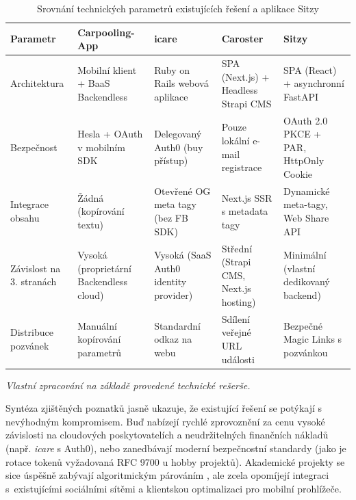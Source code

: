 \documentclass[male,czech,api_bc]{kitheses}
\renewcommand{\arraystretch}{1.23}
\newcommand{\zdroj}[1]{%
    \vspace{1ex}%
    {\footnotesize \raggedright \textit{#1}\par}%
}
\begin{document}
\begin{table}[htbp]
\renewcommand{\arraystretch}{1.4}
\small
\begin{tabularx}{\textwidth}{>{\raggedright\arraybackslash}p{3cm}
                              >{\raggedright\arraybackslash}X
                              >{\raggedright\arraybackslash}X
                              >{\raggedright\arraybackslash}X
                              >{\raggedright\arraybackslash}X}
\toprule
\textbf{Parametr} & \textbf{Carpooling-App} \cite{Raut2016} & \textbf{icare} \cite{Icare2025} & \textbf{Caroster} \cite{Caroster2026} & \textbf{Sitzy} \\
\midrule
Architektura & Mobilní klient + BaaS Backendless & Ruby on Rails webová aplikace & SPA (Next.js) + Headless Strapi CMS & SPA (React) + asynchronní FastAPI \\
\addlinespace
Bezpečnost & Hesla + OAuth v mobilním SDK & Delegovaný Auth0 (buy přístup) & Pouze lokální e-mail registrace & OAuth 2.0 PKCE + PAR, HttpOnly Cookie \\
\addlinespace
Integrace obsahu & Žádná (kopírování textu) & Otevřené OG meta tagy (bez FB SDK) & Next.js SSR s metadata tagy & Dynamické meta-tagy, Web Share API \\
\addlinespace
Závislost na 3. stranách & Vysoká (proprietární Backendless cloud) & Vysoká (SaaS Auth0 identity provider) & Střední (Strapi CMS, Next.js hosting) & Minimální (vlastní dedikovaný backend) \\
\addlinespace
Distribuce pozvánek & Manuální kopírování parametrů & Standardní odkaz na webu & Sdílení veřejné URL události & Bezpečné Magic Links s pozvánkou \\
\bottomrule
\end{tabularx}
\caption{Srovnání technických parametrů existujících řešení a aplikace Sitzy}
\label{tab:srovnani_projektu}
\zdroj{Vlastní zpracování na základě provedené technické rešerše.}
\end{table}

Syntéza zjištěných poznatků jasně ukazuje, že existující řešení se potýkají s nevýhodným kompromisem. Buď nabízejí rychlé zprovoznění za cenu vysoké závislosti na cloudových poskytovatelích a neudržitelných finančních nákladů (např. \textit{icare} s Auth0), nebo zanedbávají moderní bezpečnostní standardy (jako je rotace tokenů vyžadovaná RFC 9700 \cite{Lodderstedt2025} u hobby projektů). Akademické projekty se sice úspěšně zabývají algoritmickým párováním \cite{Tan2025}, ale zcela opomíjejí integraci s~existujícími sociálními sítěmi a klientskou optimalizaci pro mobilní prohlížeče.
\end{document}
